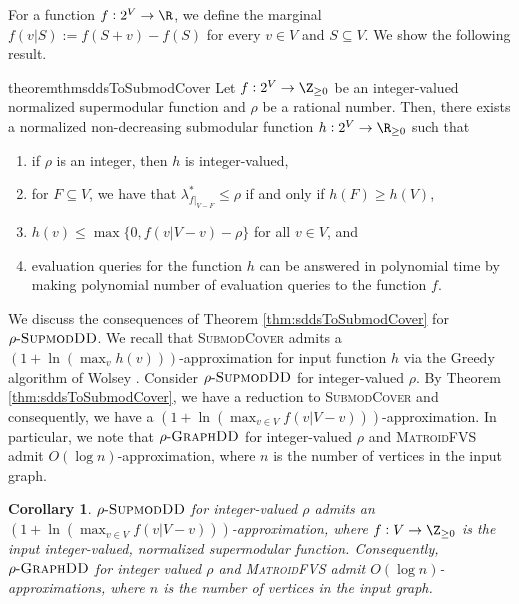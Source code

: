 \documentclass{article}
\newtheorem{corollary}{Corollary}[section]
\newcommand{\mfvs}{\textsc{MatroidFVS}\xspace}
\newcommand{\dds}{\ensuremath{\textsc{GraphDD}}\xspace}
\newcommand{\rhodds}[1]{\ensuremath{#1\text{-}\dds}\xspace}
\newcommand{\sdds}{\ensuremath{\textsc{SupmodDD}}\xspace}
\newcommand{\rhosdds}[1]{\ensuremath{#1\text{-}\sdds}}
\newcommand{\submodcover}{\textsc{SubmodCover}\xspace}
\begin{document}
For a function $f: 2^V\rightarrow \R$, we define the marginal $f(v|S):=f(S+v) - f(S)$ for every $v\in V$ and $S\subseteq V$. 
We show the following result. 

\begin{restatable}{theorem}{thmsddsToSubmodCover}\label{thm:sddsToSubmodCover}
Let $f: 2^V\rightarrow \Z_{\ge 0}$ be an integer-valued normalized supermodular function and $\rho$ be a rational number. Then, there exists a normalized non-decreasing submodular function $h:2^V\rightarrow\R_{\geq 0}$ such that 
\begin{enumerate}
    \item if $\rho$ is an integer, then $h$ is integer-valued, 
\item for $F\subseteq V$, we have that $\lambda^*_{f|_{V-F}} \leq \rho$ if and only if $h(F)\ge h(V)$, 
    \item $h(v) \leq \max\{0, f(v|V - v) - \rho\}$ for all $v \in V$, and 
    \item evaluation queries for the function $h$ can be answered in polynomial time by making polynomial number of  evaluation queries to the function $f$. 
\end{enumerate}
\end{restatable}


We discuss the consequences of Theorem \ref{thm:sddsToSubmodCover} for \rhosdds{\rho}. 
We recall that \submodcover admits a
$(1 + \ln{(\max_{v} h(v))})$-approximation 
for input function $h$ via the Greedy algorithm of Wolsey \cite{Wolsey82}. 
Consider \rhosdds{\rho} for integer-valued $\rho$. 
By Theorem \ref{thm:sddsToSubmodCover}, we have a reduction to \submodcover and consequently, we have a 
$(1 + \ln(\max_{v\in V} f(v|V-v)))$-approximation. 
In particular, we note that \rhodds{\rho} for integer-valued $\rho$ and \mfvs admit $O(\log{n})$-approximation, where $n$ is the number of vertices in the input graph. 
\iffalse
We mention that if $\rho$ is a rational value, say $\rho=p/q$, then we 
may reduce it to an instance of \rhosdds{\rho} with integer-valued $\rho$ by scaling the input function by $q$; if $\rho$ is irrational, then \rhosdds{\rho} has additional complications and cannot be simply handled by scaling. 
\fi

\begin{corollary}\label{coro:rhodds-and-mfvs}
    \rhosdds{\rho} for integer-valued $\rho$ admits an 
$(1 + \ln{(\max_{v\in V}f(v|V-v))})$-approximation, where $f:V\rightarrow\Z_{\ge 0}$ is the input integer-valued, normalized supermodular function.
    Consequently, \rhodds{\rho} for integer valued $\rho$ and \mfvs admit $O(\log{n})$-approximations, where $n$ is the number of vertices in the input graph. 
\end{corollary}
\end{document}

